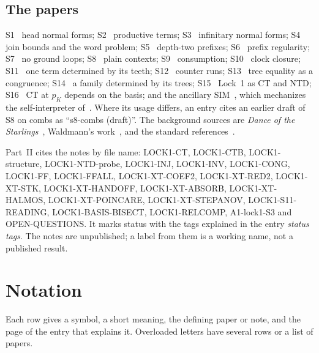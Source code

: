 \documentclass[11pt]{amsart}
\begin{document}
\subsection*{The papers}
S1~\citep{s1} head normal forms; S2~\citep{s2} productive terms; S3~\citep{s3} infinitary normal
forms; S4~\citep{s4} join bounds and the word problem; S5~\citep{s5} depth-two prefixes;
S6~\citep{s6} prefix regularity; S7~\citep{s7} no ground loops; S8~\citep{s8} plain contexts;
S9~\citep{s9} consumption; S10~\citep{s10} clock closure; S11~\citep{s11} one term determined by its teeth; S12~\citep{s12} counter
runs; S13~\citep{s13} tree equality as a congruence; S14~\citep{s14} a family determined by its trees; S15~\citep{s15} Lock~1 as CT and NTD; S16~\citep{s16} CT at $p_K$ depends on the basis; and the ancillary SIM~\citep{simech}, which mechanizes the self-interpreter of~\citep{davis-si}.
Where its usage differs, an entry cites an earlier draft of S8 on combs as
``s8-combs (draft)''. The background sources are \emph{Dance of the Starlings}~\citep{dots},
Waldmann's work~\citep{waldmann-thesis,waldmann-ic}, and the standard
references~\citep{barendregt,terese}.

{\raggedright Part~II cites the notes by file name: LOCK1-CT, LOCK1-CTB, LOCK1-structure,
LOCK1-NTD-probe, LOCK1-INJ, LOCK1-INV, LOCK1-CONG, LOCK1-FF, LOCK1-FFALL, LOCK1-XT-COEF2, LOCK1-XT-RED2,
LOCK1-XT-STK, LOCK1-XT-HANDOFF, LOCK1-XT-ABSORB, LOCK1-XT-HALMOS, LOCK1-XT-POINCARE, LOCK1-XT-STEPANOV,
LOCK1-S11-READING, LOCK1-BASIS-BISECT, LOCK1-RELCOMP, A1-lock1-S3 and OPEN-QUESTIONS. It marks status with the tags explained
in the entry \emph{status tags}. The notes are unpublished; a label from them is a working name, not
a published result.\par}

\section*{Notation}

Each row gives a symbol, a short meaning, the defining paper or note, and the page of the entry that
explains it. Overloaded letters have several rows or a list of papers.
\end{document}

